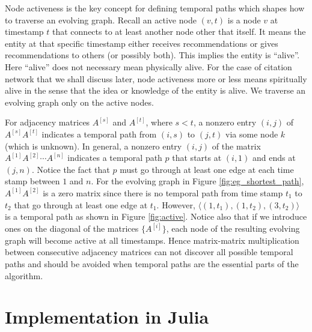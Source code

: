 \documentclass[11pt,conference,compsocconf]{IEEEtran}
\theoremstyle{definition}
\begin{document}
Node activeness is the key concept for defining temporal paths which
shapes how to traverse an evolving graph.
Recall an active node $(v,t)$ is a node $v$ at timestamp $t$
that connects to at least another node other that itself.
It means the entity at that specific timestamp either
receives recommendations or gives recommendations to others (or possibly both).
This implies the entity is ``alive''. Here ``alive'' does not necessary mean physically
alive. For the case of citation network that we shall discuss later, node activeness more or less means spiritually alive in the sense that the idea or knowledge of the entity is alive.
We traverse an evolving graph only on the active nodes.

For adjacency matrices $A^{[s]}$ and $A^{[t]}$, where $s < t$, a nonzero entry
$(i,j)$ of $A^{[s]} A^{[t]}$ indicates a temporal path from $(i,s)$ to $(j,t)$ via
some node $k$ (which is unknown).
In general, a nonzero entry $(i,j)$ of the matrix $A^{[1]}A^{[2]}\cdots A^{[n]}$
indicates a temporal path $p$ that starts at $(i,1)$ and ends at  $(j,n)$.
Notice the fact that $p$ must go through at least one edge at each time stamp between $1$ and $n$.
For the evolving graph in Figure \ref{fig:eg_shortest_path}, $A^{[1]}A^{[2]}$
is a zero matrix since there is no temporal path from time stamp $t_1$ to $t_2$ that
go through at least one edge at $t_1$. However,
$\langle(1, t_1), (1, t_2), (3,t_2)\rangle$ is a temporal path as shown in Figure \ref{fig:active}.
Notice also that if we introduce ones on the diagonal of the matrices $\{A^{[i]}\}$,
each node of the resulting evolving graph will become
active at all timestamps.
Hence matrix-matrix multiplication between consecutive
adjacency matrices can not discover all possible temporal paths and should be avoided
when temporal paths are the essential parts of the algorithm.


\section{Implementation in Julia}
\label{sec:implementation-julia}
\end{document}
